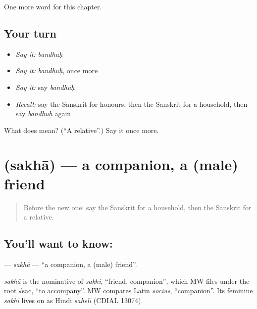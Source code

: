 \begin{grammarlens}[title={What you've built}]
One more word for this chapter.
\end{grammarlens}

\subsection*{Your turn}
\begin{itemize}
\raggedright
  \item \emph{Say it:} \emph{bandhuḥ}
  \item \emph{Say it:} \emph{bandhuḥ}, once more
  \item \emph{Say it:} say \emph{bandhuḥ}
  \item \emph{Recall:} say the Sanskrit for honours, then the Sanskrit for a household, then say \emph{bandhuḥ} again
\end{itemize}

\begin{tcolorbox}[breakable,colback=teal!4,colframe=teal!35!black,title={Before you move on}]
What does  mean? (\textquotedblleft{}A relative\textquotedblright{}.) Say it once more.
\end{tcolorbox}
\section[\texorpdfstring{\sk{सखा} (sakhā)}{सखा (sakhā)}]{ (sakhā) — a companion, a (male) friend}

\label{lesson:SA-C208-sakha}



\begin{quote}
Before the new one: say the Sanskrit for a household, then the Sanskrit for a relative.
\end{quote}

\subsection*{You'll want to know: }
\textbf{} — \emph{sakhā} — \textquotedblleft{}a companion, a (male) friend\textquotedblright{}.

\begin{cousinweb}
\emph{sakhā} is the nominative of \emph{sakhi}, \textquotedblleft{}friend, companion\textquotedblright{}, which MW files under the root √sac, \textquotedblleft{}to accompany\textquotedblright{}. MW compares Latin \emph{socius}, \textquotedblleft{}companion\textquotedblright{}. Its feminine \emph{sakhī} lives on as Hindi \emph{sahelī} (CDIAL 13074).
\end{cousinweb}

